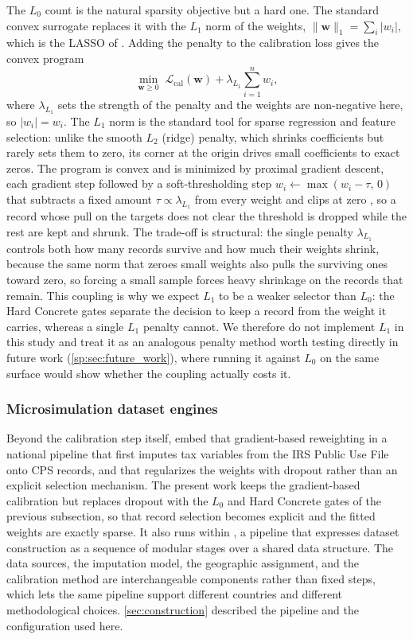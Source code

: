 The $L_0$ count is the natural sparsity objective but a hard one. The standard convex surrogate replaces
it with the $L_1$ norm of the weights, $\lVert \mathbf{w} \rVert_1 = \sum_i |w_i|$, which is the LASSO of
\citet{tibshirani1996}. Adding the penalty to the calibration loss gives the convex program
\begin{equation}
    \min_{\mathbf{w} \ge 0}\; \mathcal{L}_{\mathrm{cal}}(\mathbf{w}) + \lambda_{L_1} \sum_{i=1}^{n} w_i,
    \label{sp:eq:l1}
\end{equation}
where $\lambda_{L_1}$ sets the strength of the penalty and the weights are non-negative here, so
$|w_i| = w_i$. The $L_1$ norm is the standard tool for sparse regression and feature selection: unlike the
smooth $L_2$ (ridge) penalty, which shrinks coefficients but rarely sets them to zero, its corner at the
origin drives small coefficients to exact zeros. The program is convex and is minimized by proximal
gradient descent, each gradient step followed by a soft-thresholding step
$w_i \leftarrow \max(w_i - \tau,\, 0)$ that subtracts a fixed amount $\tau \propto \lambda_{L_1}$ from every
weight and clips at zero \citep{beck2009fista}, so a record whose pull on the targets does not clear the
threshold is dropped while the rest are kept and shrunk. The trade-off is structural: the single penalty
$\lambda_{L_1}$ controls both how many records survive and how much their weights shrink, because the same
norm that zeroes small weights also pulls the surviving ones toward zero, so forcing a small sample forces
heavy shrinkage on the records that remain. This coupling is why we expect $L_1$ to be a weaker selector
than $L_0$: the Hard Concrete gates separate the decision to keep a record from the weight it carries,
whereas a single $L_1$ penalty cannot. We therefore do not implement $L_1$ in this study and treat it as
an analogous penalty method worth testing directly in future work (\autoref{sp:sec:future_work}), where
running it against $L_0$ on the same surface would show whether the coupling actually costs it.

\subsubsection{Microsimulation dataset engines}

Beyond the calibration step itself, \citet{woodruff2024} embed that gradient-based reweighting in a
national pipeline that first imputes tax variables from the IRS Public Use File onto CPS records, and
that regularizes the weights with dropout rather than an explicit selection mechanism. The present
work keeps the gradient-based calibration but replaces dropout with the $L_0$ and Hard Concrete gates
of the previous subsection, so that record selection becomes explicit and the fitted weights are
exactly sparse. It also runs within \populace{}, a pipeline that
expresses dataset construction as a sequence of modular stages over a shared data structure. The data
sources, the imputation model, the geographic assignment, and the calibration method are
interchangeable components rather than fixed steps, which lets the same pipeline support different
countries and different methodological choices.
\autoref{sec:construction} described the pipeline and the configuration used here.
